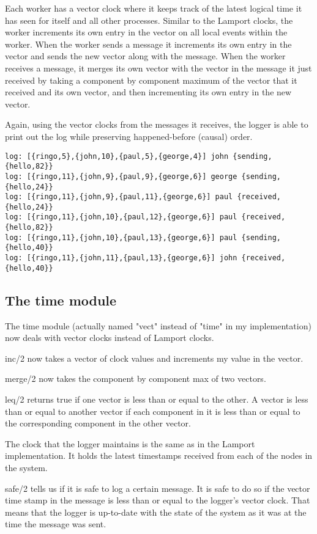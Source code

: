 \documentclass[a4paper, 11pt]{article}
\begin{document}
Each worker has a vector clock where it keeps track of the latest logical time it has seen for itself and all other processes. Similar to the Lamport clocks, the worker increments its own entry in the vector on all local events within the worker. When the worker sends a message it increments its own entry in the vector and sends the new vector along with the message. When the worker receives a message, it merges its own vector with the vector in the message it just received by taking a component by component maximum of the vector that it received and its own vector, and then incrementing its own entry in the new vector.

Again, using the vector clocks from the messages it receives, the logger is able to print out the log while preserving happened-before (causal) order.

\begin{verbatim}
log: [{ringo,5},{john,10},{paul,5},{george,4}] john {sending,{hello,82}}
log: [{ringo,11},{john,9},{paul,9},{george,6}] george {sending,{hello,24}}
log: [{ringo,11},{john,9},{paul,11},{george,6}] paul {received,{hello,24}}
log: [{ringo,11},{john,10},{paul,12},{george,6}] paul {received,{hello,82}}
log: [{ringo,11},{john,10},{paul,13},{george,6}] paul {sending,{hello,40}}
log: [{ringo,11},{john,11},{paul,13},{george,6}] john {received,{hello,40}}
\end{verbatim}

\subsection{The time module}

The time module (actually named "vect" instead of "time" in my implementation) now deals with vector clocks instead of Lamport clocks.

inc/2 now takes a vector of clock values and increments my value in the vector.

merge/2 now takes the component by component max of two vectors.

leq/2 returns true if one vector is less than or equal to the other. A vector is less than or equal to another vector if each component in it is less than or equal to the corresponding component in the other vector.

The clock that the logger maintains is the same as in the Lamport implementation. It holds the latest timestamps received from each of the nodes in the system.

safe/2 tells us if it is safe to log a certain message. It is safe to do so if the vector time stamp in the message is less than or equal to the logger's vector clock. That means that the logger is up-to-date with the state of the system as it was at the time the message was sent.
\end{document}
